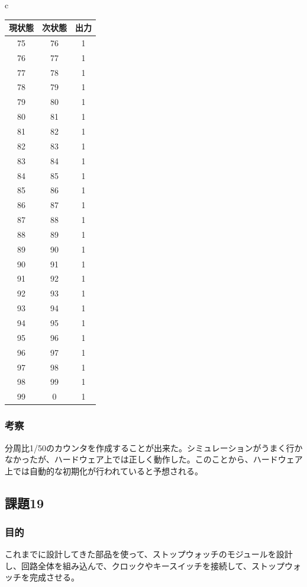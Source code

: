 \documentclass[a4paper]{jarticle}
\begin{document}
\begin{table}[!h]
\begin{center}
\begin{tabular}{c}
\begin{minipage}{0.5\hsize}
\begin{center}
\begin{tabular}{|c|c|c|}
					\hline
					現状態	&次状態	&出力\\	\hline\hline
					75	&76	&1\\	\hline
					76	&77	&1\\	\hline
					77	&78	&1\\	\hline
					78	&79	&1\\	\hline
					79	&80	&1\\	\hline
					80	&81	&1\\	\hline
					81	&82	&1\\	\hline
					82	&83	&1\\	\hline
					83	&84	&1\\	\hline
					84	&85	&1\\	\hline
					85	&86	&1\\	\hline
					86	&87	&1\\	\hline
					87	&88	&1\\	\hline
					88	&89	&1\\	\hline
					89	&90	&1\\	\hline
					90	&91	&1\\	\hline
					91	&92	&1\\	\hline
					92	&93	&1\\	\hline
					93	&94	&1\\	\hline
					94	&95	&1\\	\hline
					95	&96	&1\\	\hline
					96	&97	&1\\	\hline
					97	&98	&1\\	\hline
					98	&99	&1\\	\hline
					99	&0	&1\\	\hline
					\end{tabular}
				\end{center}
			\end{minipage}
		\end{tabular}
	\end{center}
\end{table}
\subsubsection{考察}
分周比1/50のカウンタを作成することが出来た。シミュレーションがうまく行かなかったが、ハードウェア上では正しく動作した。このことから、ハードウェア上では自動的な初期化が行われていると予想される。
\subsection{課題19}
\subsubsection{目的}
これまでに設計してきた部品を使って、ストップウォッチのモジュールを設計し、回路全体を組み込んで、クロックやキースイッチを接続して、ストップウォッチを完成させる。
\end{document}
